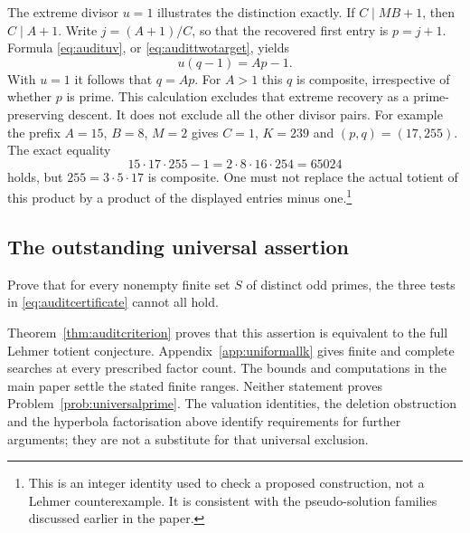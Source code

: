 The extreme divisor $u=1$ illustrates the distinction exactly. If
$C\mid MB+1$, then $C\mid A+1$. Write $j=(A+1)/C$, so that the
recovered first entry is $p=j+1$. Formula \eqref{eq:audituv}, or
\eqref{eq:audittwotarget}, yields
\[
 u(q-1)=Ap-1.
\]
With $u=1$ it follows that $q=Ap$. For $A>1$ this $q$ is composite,
irrespective of whether $p$ is prime. This calculation excludes that
extreme recovery as a prime-preserving descent. It does not exclude all
the other divisor pairs. For example the prefix $A=15$, $B=8$, $M=2$
gives $C=1$, $K=239$ and $(p,q)=(17,255)$. The exact equality
\[
 15\cdot17\cdot255-1=2\cdot8\cdot16\cdot254=65024
\]
holds, but $255=3\cdot5\cdot17$ is composite. One must not replace
the actual totient of this product by a product of the displayed
entries minus one.\footnote{This is an integer identity used to
check a proposed construction, not a Lehmer counterexample. It is
consistent with the pseudo-solution families discussed earlier in
the paper.}

\subsection{The outstanding universal assertion}
\begin{problem}\label{prob:universalprime}
Prove that for every nonempty finite set $S$ of distinct odd primes,
the three tests in \eqref{eq:auditcertificate} cannot all hold.
\end{problem}
Theorem~\ref{thm:auditcriterion} proves that this assertion is equivalent
to the full Lehmer totient conjecture. Appendix~\ref{app:uniformallk}
gives finite and complete searches at every prescribed factor count.
The bounds and computations in the main paper settle the stated finite
ranges. Neither statement proves Problem~\ref{prob:universalprime}.
The valuation identities, the deletion obstruction and the hyperbola
factorisation above identify requirements for further arguments; they
are not a substitute for that universal exclusion.
